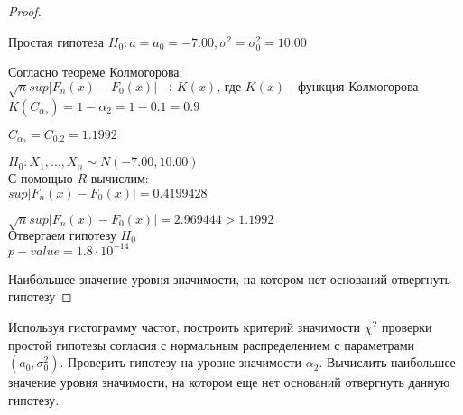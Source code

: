 \begin{proof}
	$ $
	
	Простая гипотеза $H_0: a=a_0=-7.00, \sigma^2=\sigma_0^2=10.00$ 
	
	Согласно теореме Колмогорова: \\

	$\sqrt{n}sup|F_n(x)-F_0(x)|\rightarrow K(x)\text{, где $K(x)$ - функция Колмогорова}$ \\

	$K(C_{\alpha_2})=1-\alpha_2=1-0.1=0.9$
	
	$C_{\alpha_2}=C_{0.2}=1.1992$
	
    $H_0: X_1, ..., X_n\sim N(-7.00, 10.00)$ \\
	
	С помощью $R$ вычислим: \\

		$sup|F_n(x)-F_0(x)| = 0.4199428$
		
		$\sqrt{n}sup|F_n(x)-F_0(x)| = 2.969444 > 1.1992$ \\
		
		$\text{Отвергаем гипотезу } H_0$ \\
		
		$p-value = 1.8 \cdot 10^{-14}$ 

	Наибольшее значение уровня значимости, на котором нет оснований отвергнуть гипотезу
\end{proof}


\begin{problem}
	Используя гистограмму частот, построить критерий значимости $\chi^2$ проверки простой гипотезы согласия с нормальным распределением с параметрами $(a_0, \sigma_0^2)$. Проверить гипотезу на уровне значимости $\alpha_2$. Вычислить наибольшее значение уровня значимости, на котором еще нет оснований отвергнуть данную гипотезу. 
\end{problem}

